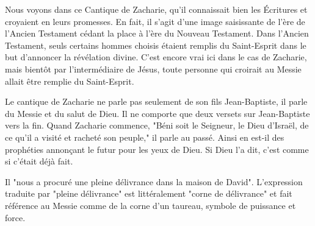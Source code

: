 

Nous voyons dans ce Cantique de Zacharie, qu'il connaissait bien les Écritures et croyaient en leurs promesses. En fait, il s'agit d'une image saisissante de l'ère de l'Ancien Testament cédant la place à l'ère du Nouveau Testament. Dans l'Ancien Testament, seuls certains hommes choisis étaient remplis du Saint-Esprit dans le but d'annoncer la révélation divine. C'est encore vrai ici dans le cas de Zacharie, mais bientôt par l'intermédiaire de Jésus, toute personne qui croirait au Messie allait être remplie du Saint-Esprit.

Le cantique de Zacharie ne parle pas seulement de son fils Jean-Baptiste, il parle du Messie et du salut de Dieu. Il ne comporte que deux versets sur Jean-Baptiste vers la fin. Quand Zacharie commence, "Béni soit le Seigneur, le Dieu d’Israël, de ce qu’il a visité et racheté son peuple," il parle au passé. Ainsi en est-il des prophéties annonçant le futur pour les yeux de Dieu. Si Dieu l'a dit, c'est comme si c'était déjà fait.

Il "nous a procuré une pleine délivrance dans la maison de David". L'expression traduite par "pleine délivrance" est littéralement "corne de délivrance" et fait référence au Messie comme de la corne d'un taureau, symbole de puissance et force.

